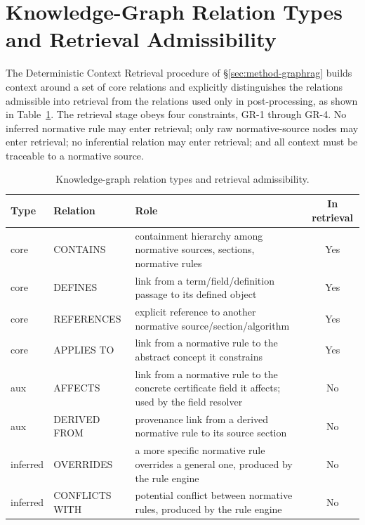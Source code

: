 
\section{Knowledge-Graph Relation Types and Retrieval Admissibility}
\label{app:kg}

The Deterministic Context Retrieval procedure of \S\ref{sec:method-graphrag} builds context around a set of
core relations and explicitly distinguishes the relations admissible into
retrieval from the relations used only in post-processing,
as shown in Table~\ref{tab:kgrel}. The retrieval stage
obeys four constraints, GR-1 through GR-4. No inferred normative rule may enter
retrieval; only raw normative-source nodes may enter retrieval; no inferential
relation may enter retrieval; and all context must be traceable to a
normative source.

\begin{table}[!htbp]
\centering
\footnotesize
\setlength{\tabcolsep}{4pt}
\caption{Knowledge-graph relation types and retrieval admissibility.}
\label{tab:kgrel}
\begin{tabularx}{\columnwidth}{@{}l l X c@{}}
\toprule
Type & Relation & Role & In retrieval \\
\midrule
core & CONTAINS & containment hierarchy among normative sources, sections, normative rules & Yes \\
core & DEFINES & link from a term/field/definition passage to its defined
  object & Yes \\
core & REFERENCES & explicit reference to another normative source/section/algorithm & Yes \\
core & APPLIES TO & link from a normative rule to the abstract concept it constrains
  & Yes \\
aux & AFFECTS & link from a normative rule to the concrete certificate field it affects;
  used by the field resolver & No \\
aux & DERIVED FROM & provenance link from a derived normative rule to its source section
  & No \\
inferred & OVERRIDES & a more specific normative rule overrides a general one, produced by
  the rule engine & No \\
inferred & CONFLICTS WITH & potential conflict between normative rules, produced by the
  rule engine & No \\
\bottomrule
\end{tabularx}
\end{table}


